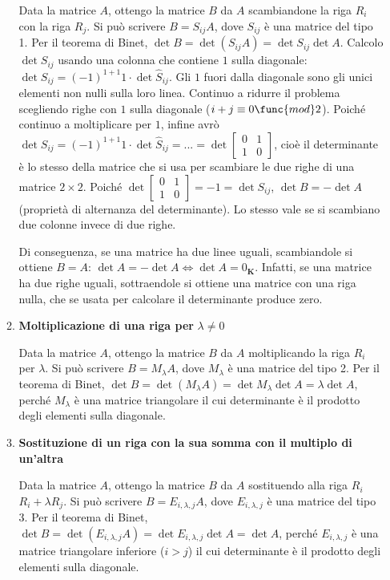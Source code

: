 \documentclass{article}
\begin{document}
\begin{enumerate}
\begin{enumerate}
Data la matrice $A$, ottengo la matrice $B$ da $A$ scambiandone la riga $%
R_{i}$ con la riga $R_{j}$. Si pu\`{o} scrivere $B=S_{ij}A$, dove $S_{ij}$ 
\`{e} una matrice del tipo 1. Per il teorema di Binet, $\det B=\det \left(
S_{ij}A\right) =\det S_{ij}\det A$. Calcolo $\det S_{ij}$ usando una colonna
che contiene $1$ sulla diagonale: $\det S_{ij}=\left( -1\right) ^{1+1}1\cdot
\det \hat{S}_{ij}$. Gli $1$ fuori dalla diagonale sono gli unici elementi
non nulli sulla loro linea. Continuo a ridurre il problema scegliendo righe
con $1$ sulla diagonale ($i+j\equiv 0\func{mod}2$). Poich\'{e} continuo a
moltiplicare per $1$, infine avr\`{o} $\det S_{ij}=\left( -1\right)
^{1+1}1\cdot \det \hat{S}_{ij}=...=\det \left[ 
\begin{array}{cc}
0 & 1 \\ 
1 & 0%
\end{array}%
\right] $, cio\`{e} il determinante \`{e} lo stesso della matrice che si usa
per scambiare le due righe di una matrice $2\times 2$. Poich\'{e} $\det %
\left[ 
\begin{array}{cc}
0 & 1 \\ 
1 & 0%
\end{array}%
\right] =-1=\det S_{ij}$, $\det B=-\det A$ (propriet\`{a} di alternanza del
determinante). Lo stesso vale se si scambiano due colonne invece di due
righe.

Di conseguenza, se una matrice ha due linee uguali, scambiandole si ottiene $%
B=A$: $\det A=-\det A\Longleftrightarrow \det A=0_{\mathbf{K}}$. Infatti, se
una matrice ha due righe uguali, sottraendole si ottiene una matrice con una
riga nulla, che se usata per calcolare il determinante produce zero.

\item \textbf{Moltiplicazione di una riga per }$\lambda \neq 0$

Data la matrice $A$, ottengo la matrice $B$ da $A$ moltiplicando la riga $%
R_{i}$ per $\lambda $. Si pu\`{o} scrivere $B=M_{\lambda }A$, dove $%
M_{\lambda }$ \`{e} una matrice del tipo 2. Per il teorema di Binet, $\det
B=\det \left( M_{\lambda }A\right) =\det M_{\lambda }\det A=\lambda \det A$,
perch\'{e} $M_{\lambda }$ \`{e} una matrice triangolare il cui determinante 
\`{e} il prodotto degli elementi sulla diagonale.

\item \textbf{Sostituzione di un riga con la sua somma con il multiplo di
un'altra}

Data la matrice $A$, ottengo la matrice $B$ da $A$ sostituendo alla riga $%
R_{i}$ $R_{i}+\lambda R_{j}$. Si pu\`{o} scrivere $B=E_{i,\lambda ,j}A$,
dove $E_{i,\lambda ,j}$ \`{e} una matrice del tipo 3. Per il teorema di
Binet, $\det B=\det \left( E_{i,\lambda ,j}A\right) =\det E_{i,\lambda
,j}\det A=\det A$, perch\'{e} $E_{i,\lambda ,j}$ \`{e} una matrice
triangolare inferiore ($i>j$) il cui determinante \`{e} il prodotto degli
elementi sulla diagonale.
\end{enumerate}
\end{enumerate}
\end{document}
